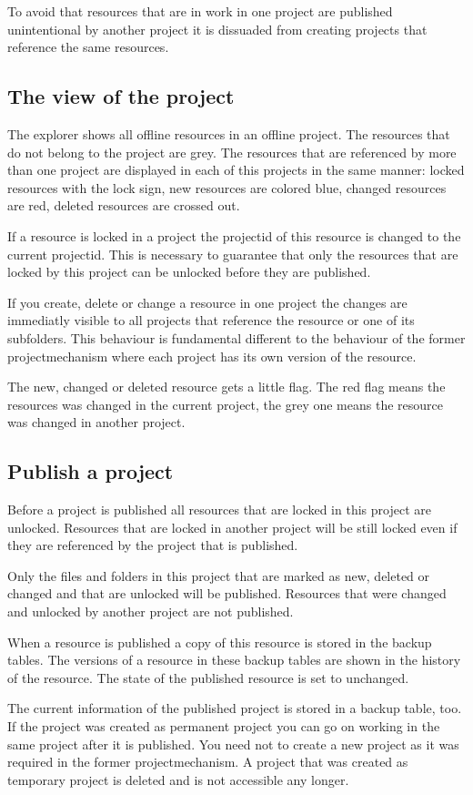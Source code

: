 To avoid that resources that are in work in one project are
published unintentional by another project it is dissuaded from
creating projects that reference the same resources.

\subsection{The view of the project}

The explorer shows all offline resources in an offline project.
The resources that do not belong to the project are grey. The
resources that are referenced by more than one project are
displayed in each of this projects in the same manner: locked
resources with the lock sign, new resources are colored blue,
changed resources are red, deleted resources are crossed out.

If a resource is locked in a project the projectid of this
resource is changed to the current projectid. This is necessary to
guarantee that only the resources that are locked by this project
can be unlocked before they are published.

If you create, delete or change a resource in one project the
changes are immediatly visible to all projects that reference the
resource or one of its subfolders. This behaviour is fundamental
different to the behaviour of the former projectmechanism where
each project has its own version of the resource.

The new, changed or deleted resource gets a little flag. The red
flag means the resources was changed in the current project, the
grey one means the resource was changed in another project.

\subsection{Publish a project}

Before a project is published all resources that are locked in
this project are unlocked. Resources that are locked in another
project will be still locked even if they are referenced by the
project that is published.

Only the files and folders in this project that are marked as new,
deleted or changed and that are unlocked will be published.
Resources that were changed and unlocked by another project are
not published.

When a resource is published a copy of this resource is stored in
the backup tables. The versions of a resource in these backup
tables are shown in the  history of the resource.
The state of the published resource is set to unchanged.

The current information of the published project is stored in a
backup table, too. If the project was created as permanent project
you can go on working in the same project after it is published.
You need not to create a new project as it was required in the
former projectmechanism. A project that was created as temporary
project is deleted and is not accessible any longer.
